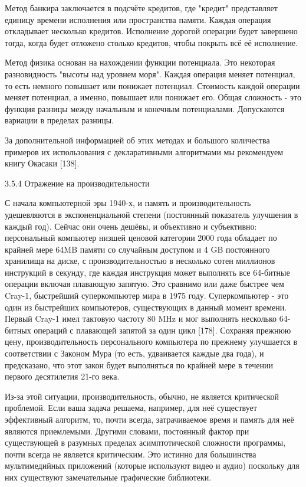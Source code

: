 Метод банкира заключается в подсчёте кредитов, где "кредит" представляет единицу времени исполнения или пространства памяти. Каждая операция откладывает несколько кредитов. Исполнение дорогой операции будет завершено тогда, когда будет отложено столько кредитов, чтобы покрыть всё её исполнение.

Метод физика основан на нахождении функции потенциала. Это некоторая разновидность "высоты над уровнем моря". Каждая операция меняет потенциал, то есть немного повышает или понижает потенциал. Стоимость каждой операции меняет потенциал, а именно, повышает или понижает его. Общая сложность - это функция разницы между начальным и конечным потенциалами. Допускаются вариации в пределах разницы.

За дополнительной информацией об этих методах и большого количества примеров их использования с декларативными алгоритмами мы рекомендуем книгу Окасаки [138].

3.5.4 Отражение на производительности

С начала компьютерной эры 1940-х, и память и производительность удешевляются в экспоненциальной степени (постоянный показатель улучшения в каждый год). Сейчас они очень дешёвы, и объективно и субъективно: персональный компьютер низшей ценовой категории 2000 года обладает по крайней мере 64MB памяти со случайным доступом и 4 GB постоянного хранилища на диске, с производительностью в несколько сотен миллионов инструкций в секунду, где каждая инструкция может выполнять все 64-битные операции включая плавающую запятую. Это сравнимо или даже быстрее чем Cray-1, быстрейший суперкомпьютер мира в 1975 году. Суперкомпьютер - это один из быстрейших компьютеров, существующих в данный момент времени. Первый Cray-1 имел тактовую частоту 80 MHz и мог выполнять несколько 64-битных операций с плавающей запятой за один цикл [178]. Сохраняя прежнюю цену, производительность персонального компьютера по прежнему улучшается в соответствии с Законом Мура (то есть, удваивается каждые два года), и предсказано, что этот закон будет выполняться по крайней мере в течении первого десятилетия 21-го века.

Из-за этой ситуации, производительность, обычно, не является критической проблемой. Если ваша задача решаема, например, для неё существует эффективный алгоритм, то, почти всегда, затрачиваемое время и память для неё являются приемлемыми. Другими словами, постоянный фактор при существующей в разумных пределах асимптотической сложности программы, почти всегда не является критическим. Это истинно для большинства мультимедийных приложений (которые используют видео и аудио) поскольку для них существуют замечательные графические библиотеки.

